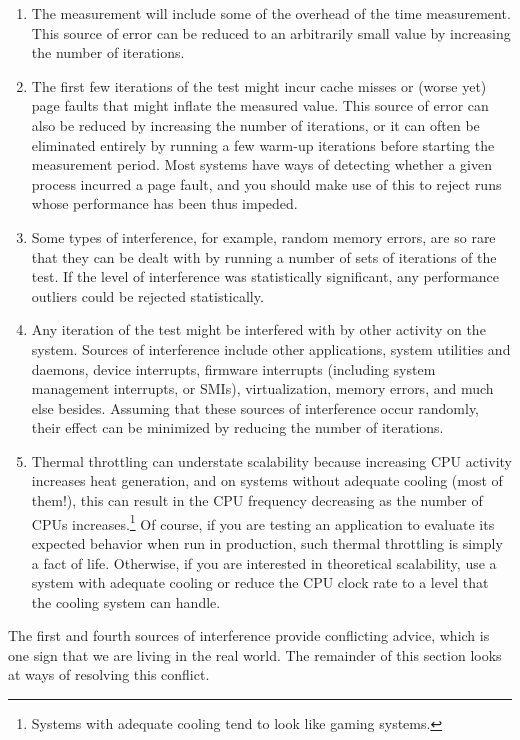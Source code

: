 \begin{enumerate}
\item	The measurement will include some of the overhead of
	the time measurement.
	This source of error can be reduced to an arbitrarily small
	value by increasing the number of iterations.
\item	The first few iterations of the test might incur cache misses
	or (worse yet) page faults that might inflate the measured
	value.
	This source of error can also be reduced by increasing the
	number of iterations, or it can often be eliminated entirely
	by running a few warm-up iterations before starting the
	measurement period.
	Most systems have ways of detecting whether a given process
	incurred a page fault, and you should make use of this to
	reject runs whose performance has been thus impeded.
\item	Some types of interference, for example, random memory errors,
	are so rare that they can be dealt with by running a number
	of sets of iterations of the test.
	If the level of interference was statistically significant,
	any performance outliers could be rejected statistically.
\item	Any iteration of the test might be interfered with by other
	activity on the system.
	Sources of interference include other applications, system
	utilities and daemons, device interrupts, firmware interrupts
	(including system management interrupts, or SMIs),
	virtualization, memory errors, and much else besides.
	Assuming that these sources of interference occur randomly,
	their effect can be minimized by reducing the number of
	iterations.
\item	Thermal throttling can understate scalability because increasing
	CPU activity increases heat generation, and on systems without
	adequate cooling (most of them!), this can result in the CPU
	frequency decreasing as the number of CPUs increases.\footnote{
		Systems with adequate cooling tend to look like gaming systems.}
	Of course, if you are testing an application to evaluate its
	expected behavior when run in production, such thermal throttling
	is simply a fact of life.
	Otherwise, if you are interested in theoretical scalability,
	use a system with adequate cooling or reduce the CPU clock rate
	to a level that the cooling system can handle.
\end{enumerate}

The first and fourth sources of interference provide conflicting advice,
which is one sign that we are living in the real world.
The remainder of this section looks at ways of resolving this conflict.

